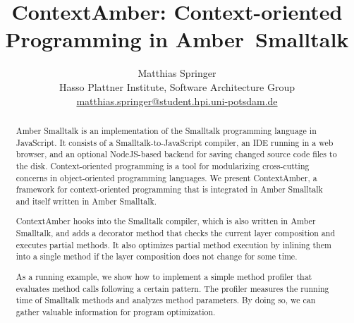 \documentclass[english,paper=a4,twocolumn=true,DIV=calc,fontsize=9pt]{scrartcl}
\begin{document}
%

\title{ContextAmber: Context-oriented Programming in Amber~Smalltalk}

\author{
Matthias Springer\\
       {Hasso Plattner Institute, Software Architecture Group}\\
       \url{matthias.springer@student.hpi.uni-potsdam.de}
}

\maketitle
\begin{abstract}
Amber Smalltalk is an implementation of the Smalltalk programming language in JavaScript. It consists of a Smalltalk-to-JavaScript compiler, an IDE running in a web browser, and an optional NodeJS-based backend for saving changed source code files to the disk. Context-oriented programming is a tool for modularizing cross-cutting concerns in object-oriented programming languages. We present ContextAmber, a framework for context-oriented programming that is integrated in Amber Smalltalk and itself written in Amber Smalltalk.

ContextAmber hooks into the Smalltalk compiler, which is also written in Amber Smalltalk, and adds a decorator method that checks the current layer composition and executes partial methods. It also optimizes partial method execution by inlining them into a single method if the layer composition does not change for some time.

As a running example, we show how to implement a simple method profiler that evaluates method calls following a certain pattern. The profiler measures the running time of Smalltalk methods and analyzes method parameters. By doing so, we can gather valuable information for program optimization.
\end{abstract}

\end{document}
